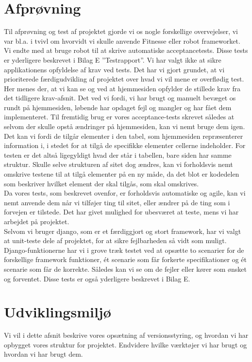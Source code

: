 \documentclass[12pt]{article}
\begin{document}
\section{Afprøvning}
\label{sec:afproevning}
Til afprøvning og test af projektet gjorde vi os nogle forskellige overvejelser, vi var bl.a. i tvivl om hvorvidt vi
skulle anvende Fitnesse eller robot frameworket. Vi endte med at bruge robot til at skrive automatiske acceptancetests.
Disse tests er yderligere beskrevet i Bilag E ''Testrapport''.
Vi har valgt ikke at sikre applikationens opfyldelse af krav ved tests. Det har vi gjort grundet, at vi prioriterede
færdigudvikling af projektet over hvad vi vil mene er overflødig test. Her menes der, at vi kan se og ved at hjemmesiden
opfylder de stillede krav fra det tidligere krav-afsnit. Det ved vi fordi, vi har brugt og manuelt bevæget os rundt på
hjemmesiden, løbende har opdaget fejl og mangler og har fået dem implementeret. 
Til fremtidig brug er vores acceptance-tests skrevet således at selvom der skulle opstå ændringer på hjemmesiden, kan vi
nemt bruge dem igen. Det kan vi fordi de tilgår elementer i den tabel, som hjemmesiden repræsenterer information i, i
stedet for at tilgå de specifikke elementer cellerne indeholder. For testen er det altså ligegyldigt hvad der står i
tabellen, bare siden har samme struktur. Skulle selve strukturen af sitet dog ændres, kan vi forholdsvis nemt omskrive
testene til at tilgå elementer på en ny måde, da det blot er kodedelen som beskriver hvilket element der skal tilgås, som
skal omskrives. \\ 
Da vores tests, som beskrevet ovenfor, er forholdsvis automatiske og agile, kan vi nemt anvende dem når vi tilføjer ting
til sitet, eller ændrer på de ting som i forvejen er tilstede. Det har givet mulighed for ubesværet at teste, mens vi har
arbejdet på projektet. \\
Selvom vi bruger django, som er et færdiggjort og stort framework, har vi valgt at unit-teste dele af projektet, for at
sikre fejlbarheden så vidt som muligt. Django-funktionerne har vi i grove træk testet ved at opsætte to scenarier for de
forskellige framework funktioner, ét scenarie som får forkerte specifikationer og ét scenarie som får de korrekte. Således
kan vi se om de fejler eller kører som ønsket og forventet. Disse tests er også yderligere beskrevet i Bilag E. 
\section{Udviklingsmiljø}
\label{sec:udvikling}
Vi vil i dette afsnit beskrive vores opsætning af versionsstyring, og hvordan vi har opbygget vores struktur for projektet. Endvidere hvilke værktøjer vi har brugt og hvordan vi har brugt dem.
\end{document}
